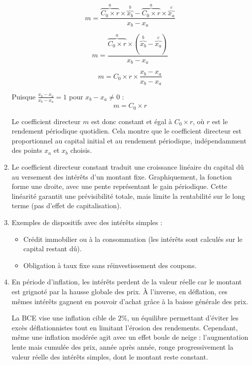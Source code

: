 \documentclass{article}
\begin{document}
\begin{enumerate}[label=\textbf{R1.\arabic*}]
          \[
              m = \frac{\overset{a}{\overbrace{C_0 \times r}} \times \overset{b}{\overbrace{x_b}} - \overset{a}{\overbrace{C_0 \times r}} \times \overset{c}{\overbrace{x_a}}}{x_b - x_a}
          \]
              
          \[
              m = \frac{\overset{a}{\overbrace{C_0 \times r}} \times (\overset{b}{\overbrace{x_b}} - \overset{c}{\overbrace{x_a}})}{x_b - x_a}
          \]
          
          \[
              m = C_0 \times r \times \frac{x_b - x_a}{x_b - x_a}
          \]
              
          Puisque $\frac{x_b - x_a}{x_b - x_a} = 1$ pour $x_b - x_a \neq 0$ :
          \[
              \boxed{m = C_0 \times r}
          \]
              
          Le coefficient directeur \( m \) est donc constant et égal à \( C_0 \times r \), où \( r \) est le rendement périodique quotidien. Cela montre que le coefficient directeur est proportionnel au capital initial et au rendement périodique, indépendamment des points \( x_a \) et \( x_b \) choisis.
          
    \item Le coefficient directeur constant traduit une croissance linéaire du capital dû au versement des intérêts d'un montant fixe. Graphiquement, la fonction forme une droite, avec une pente représentant le gain périodique. Cette linéarité garantit une prévisibilité totale, mais limite la rentabilité sur le long terme (pas d’effet de capitalisation).
          
    \item Exemples de dispositifs avec des intérêts simples :
          \begin{itemize}
              \item Crédit immobilier ou à la consommation (les intérêts  sont calculés sur le capital restant dû).
              \item Obligation à taux fixe sans réinvestissement des coupons.
          \end{itemize}
          
    \item En période d'inflation, les intérêts perdent de la valeur réelle car le montant est grignoté par la hausse globale des prix. À l’inverse, en déflation, ces mêmes intérêts gagnent en pouvoir d’achat grâce à la baisse générale des prix. 
          
          La BCE vise une inflation cible de \( 2\% \), un équilibre permettant d’éviter les excès déflationnistes tout en limitant l’érosion des rendements. Cependant, même une inflation modérée agit avec un effet boule de neige : l’augmentation lente mais cumulée des prix, année après année, ronge progressivement la valeur réelle des intérêts simples, dont le montant reste constant.
          

\end{enumerate}
\end{document}
